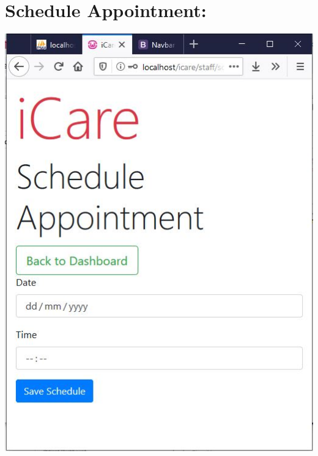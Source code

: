 \documentclass[a4paper,12pt]{report}
\begin{document}
\section*{Schedule Appointment:}
\includegraphics[scale=0.8]{Implementation/scheduleAppointment.JPG}
\end{document}
